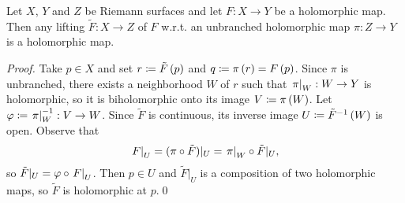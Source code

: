 \documentclass[../Moduli_Spaces_of_Riemann_Surfaces.tex]{subfiles}
\begin{document}
    \begin{proposition}
        Let $X$, $Y$ and $Z$ be Riemann surfaces and let $F:X\to Y$ be a holomorphic map. Then any lifting $\tilde{F}:X\to Z$ of $F$ w.r.t. an unbranched holomorphic map $\pi:Z\to Y$ is a holomorphic map.
    \end{proposition}
    \vspace{-0.1in}
    \begin{proof}
        Take $p\in X$ and set $r\coloneqq\tilde{F}\left(p\right)$ and $q\coloneqq\pi\left(r\right)=F\left(p\right)$. Since $\pi$ is unbranched, there exists a neighborhood $W$ of $r$ such that $\left.\pi\right|_W:W\to Y$ is holomorphic, so it is biholomorphic onto its image $V\coloneqq\pi\left(W\right)$. Let $\varphi\coloneqq\left.\pi\right|_W^{-1}:V\to W $. Since $\tilde{F}$ is continuous, its inverse image $U\coloneqq\tilde{F}^{-1}\left(W\right)$ is open. Observe that
        \begin{equation*}
            \left.F\right|_U=(\pi\circ\tilde{F})|_U=\left.\pi\right|_W\circ\tilde{F}|_U,
        \end{equation*}
        so $\tilde{F}|_U=\varphi\circ\left.F\right|_U$. Then $p\in U$ and $\tilde{F}|_U$ is a composition of two holomorphic maps, so $\tilde{F}$ is holomorphic at $p$.\qed
    \end{proof}
\end{document}
